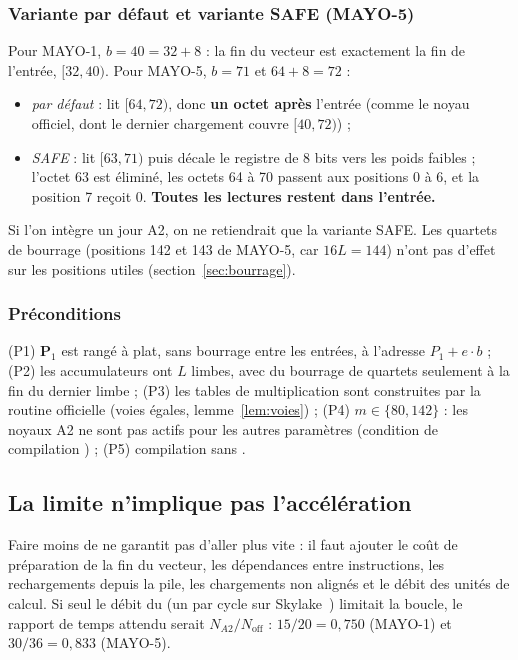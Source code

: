 \subsubsection{Variante par défaut et variante SAFE (MAYO-5)}
Pour MAYO-1, $b=40=32+8$ : la fin du vecteur est exactement la fin de l'entrée, $[32,40)$. Pour MAYO-5, $b=71$ et $64+8=72$ :
\begin{itemize}[nosep]
\item \emph{par défaut} : lit $[64,72)$, donc \textbf{un octet après} l'entrée (comme le noyau officiel, dont le dernier chargement couvre $[40,72)$) ;
\item \emph{SAFE} : lit $[63,71)$ puis décale le registre de 8 bits vers les poids faibles ; l'octet 63 est éliminé, les octets 64 à 70 passent aux positions 0 à 6, et la position 7 reçoit 0. \textbf{Toutes les lectures restent dans l'entrée.}
\end{itemize}
Si l'on intègre un jour A2, on ne retiendrait que la variante SAFE. Les quartets de bourrage (positions 142 et 143 de MAYO-5, car $16L=144$) n'ont pas d'effet sur les positions utiles (section~\ref{sec:bourrage}).

\subsubsection{Préconditions}
(P1) $\mathbf{P}_1$ est rangé à plat, sans bourrage entre les entrées, à l'adresse $P_1+e\cdot b$ ; (P2) les accumulateurs ont $L$ limbes, avec du bourrage de quartets seulement à la fin du dernier limbe ; (P3) les tables de multiplication sont construites par la routine officielle (voies égales, lemme~\ref{lem:voies}) ; (P4) $m\in\{80,142\}$ : les noyaux A2 ne sont pas actifs pour les autres paramètres (condition de compilation ) ; (P5) compilation sans .

\subsection{La limite n'implique pas l'accélération}\label{sec:perfborne}
Faire moins de \vpshufb{} ne garantit pas d'aller plus vite : il faut ajouter le coût de préparation de la fin du vecteur, les dépendances entre instructions, les rechargements depuis la pile, les chargements non alignés et le débit des unités de calcul. Si seul le débit du \vpshufb{} (un par cycle sur Skylake~\cite{nibbling}) limitait la boucle, le rapport de temps attendu serait $N_{A2}/N_{\mathrm{off}}$ : $15/20=0{,}750$ (MAYO-1) et $30/36=0{,}833$ (MAYO-5).

